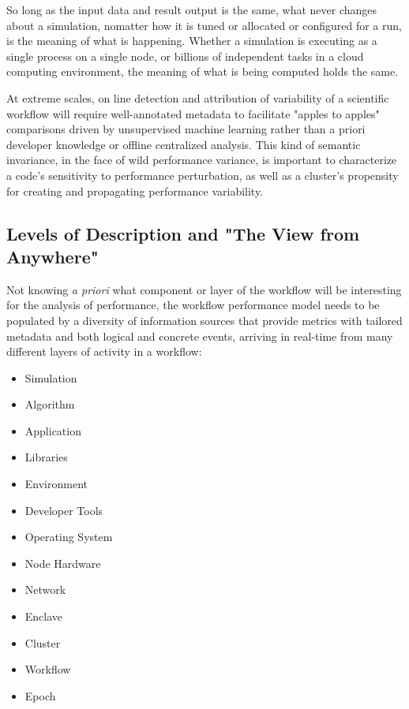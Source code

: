 
So long as the input data and result output is the same, what never
changes about a simulation, nomatter how it is tuned or allocated or
configured for a run, is the meaning of what is happening.  Whether a
simulation is executing as a single process on a single node, or
billions of independent tasks in a cloud computing environment, the
meaning of what is being computed holds the same.

At extreme scales, on line detection and attribution of variability of
a scientific workflow will require well-annotated metadata to
facilitate "apples to apples" comparisons driven by unsupervised
machine learning rather than a priori developer knowledge or offline
centralized analysis. This kind of semantic invariance, in the face of
wild performance variance, is important to characterize a code's
sensitivity to performance perturbation, as well as a cluster's
propensity for creating and propagating performance variability.


\subsection{Levels of Description and "The View from Anywhere"}
Not knowing \textit{a priori} what component or layer of the workflow
will be interesting for the analysis of performance, the workflow
performance model needs to be populated by a diversity of information
sources that provide metrics with tailored metadata and both logical
and concrete events, arriving in real-time from many different layers
of activity in a workflow:
\begin{itemize}
    \item Simulation
    \item Algorithm
    \item Application
    \item Libraries
    \item Environment
    \item Developer Tools
    \item Operating System
    \item Node Hardware
    \item Network
    \item Enclave
    \item Cluster
    \item Workflow
    \item Epoch	
\end{itemize}

